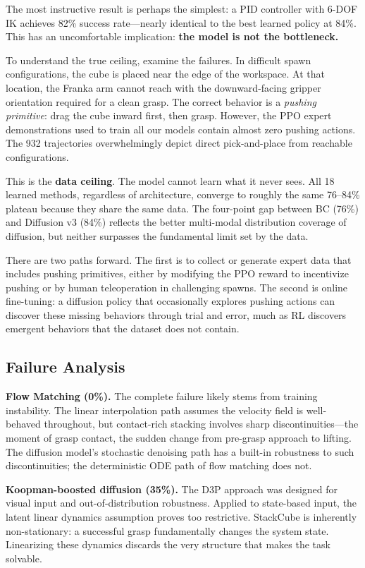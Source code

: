 \documentclass[twocolumn]{article}
\begin{document}
The most instructive result is perhaps the simplest: a PID controller with 6-DOF IK achieves 82\% success rate---nearly identical to the best learned policy at 84\%. This has an uncomfortable implication: \textbf{the model is not the bottleneck.}

To understand the true ceiling, examine the failures. In difficult spawn configurations, the cube is placed near the edge of the workspace. At that location, the Franka arm cannot reach with the downward-facing gripper orientation required for a clean grasp. The correct behavior is a \emph{pushing primitive}: drag the cube inward first, then grasp. However, the PPO expert demonstrations used to train all our models contain almost zero pushing actions. The 932 trajectories overwhelmingly depict direct pick-and-place from reachable configurations.

This is the \textbf{data ceiling}. The model cannot learn what it never sees. All 18 learned methods, regardless of architecture, converge to roughly the same 76--84\% plateau because they share the same data. The four-point gap between BC (76\%) and Diffusion v3 (84\%) reflects the better multi-modal distribution coverage of diffusion, but neither surpasses the fundamental limit set by the data.

There are two paths forward. The first is to collect or generate expert data that includes pushing primitives, either by modifying the PPO reward to incentivize pushing or by human teleoperation in challenging spawns. The second is online fine-tuning: a diffusion policy that occasionally explores pushing actions can discover these missing behaviors through trial and error, much as RL discovers emergent behaviors that the dataset does not contain.

\subsection{Failure Analysis}

\textbf{Flow Matching (0\%).} The complete failure likely stems from training instability. The linear interpolation path assumes the velocity field is well-behaved throughout, but contact-rich stacking involves sharp discontinuities---the moment of grasp contact, the sudden change from pre-grasp approach to lifting. The diffusion model's stochastic denoising path has a built-in robustness to such discontinuities; the deterministic ODE path of flow matching does not.

\textbf{Koopman-boosted diffusion (35\%).} The D3P approach \cite{huang2025d3p} was designed for visual input and out-of-distribution robustness. Applied to state-based input, the latent linear dynamics assumption proves too restrictive. StackCube is inherently non-stationary: a successful grasp fundamentally changes the system state. Linearizing these dynamics discards the very structure that makes the task solvable.
\end{document}
